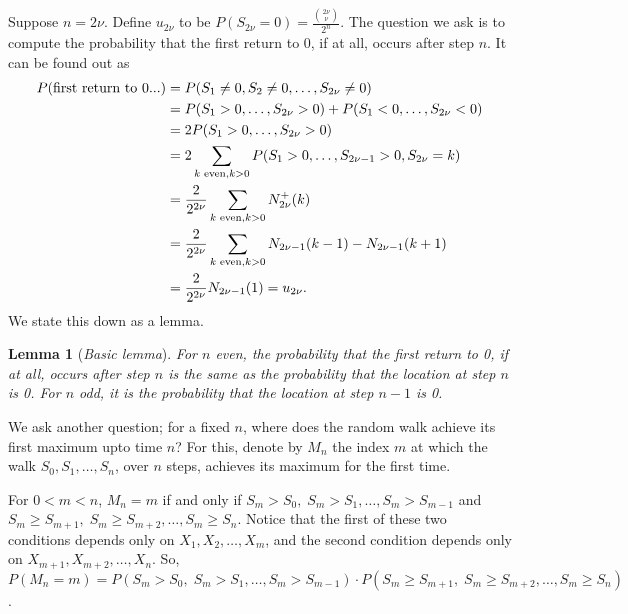 \documentclass[15pt,a4paper]{book}
\newtheorem{lemma}[theorem]{Lemma}
\theoremstyle{definition}
\newcommand{\eax}[1]{\emph{#1}\index{#1}} %
\begin{document}
Suppose $n = 2\nu$. Define $u_{2\nu}$ to be $P(S_{2\nu}=0) = \frac{\binom{2\nu}{\nu}}{2^{n}}$. The question we ask is to compute the probability that the first return to 0, if at all, occurs after step $n$. It can be found out as
\begin{align}
    P(\text{first return to $0$...}) &= P(S_{1}\neq 0, S_{2} \neq 0, \ldots, S_{2\nu} \neq 0) \\
    &= P(S_{1}>0,\ldots,S_{2\nu}>0) + P(S_{1}<0,\ldots,S_{2\nu}<0) \notag \\
    &= 2P(S_{1}>0,\ldots,S_{2\nu}>0) \notag \\
    &= 2 \sum_{k \text{ even}, k>0} P(S_{1}>0,\ldots,S_{2\nu-1}>0,S_{2\nu}=k) \notag \\
    &= \frac{2}{2^{2\nu}} \sum_{k \text{ even}, k>0} N_{2\nu}^{+}(k) \notag \\
    &= \frac{2}{2^{2\nu}} \sum_{k \text{ even}, k>0} N_{2\nu-1}(k-1)-N_{2\nu-1}(k+1) \notag \\
    &= \frac{2}{2^{2\nu}} N_{2\nu-1}(1) = u_{2\nu}.
\end{align}
We state this down as a lemma.
\begin{lemma}[\eax{Basic lemma}]
    For $n$ even, the probability that the first return to 0, if at all, occurs after step $n$ is the same as the probability that the location at step $n$ is 0. For $n$ odd, it is the probability that the location at step $n-1$ is 0.
\end{lemma}
We ask another question; for a fixed $n$, where does the random walk achieve its first maximum upto time $n$? For this, denote by $M_{n}$ the index $m$ at which the walk $S_{0},S_{1},\ldots,S_{n}$, over $n$ steps, achieves its maximum for the first time.

For $0<m<n$, $M_{n}=m$ if and only if $S_{m}>S_{0},\; S_{m}>S_{1},\ldots,S_{m}>S_{m-1}$ and $S_{m} \geq S_{m+1},\; S_{m} \geq S_{m+2}, \ldots, S_{m} \geq S_{n}$. Notice that the first of these two conditions depends only on $X_{1},X_{2},\ldots,X_{m}$, and the second condition depends only on $X_{m+1},X_{m+2},\ldots,X_{n}$. So, $P(M_{n}=m) = P(S_{m}>S_{0},\; S_{m}>S_{1},\ldots,S_{m}>S_{m-1}) \cdot P(S_{m} \geq S_{m+1},\; S_{m} \geq S_{m+2}, \ldots, S_{m} \geq S_{n})$.
\end{document}
